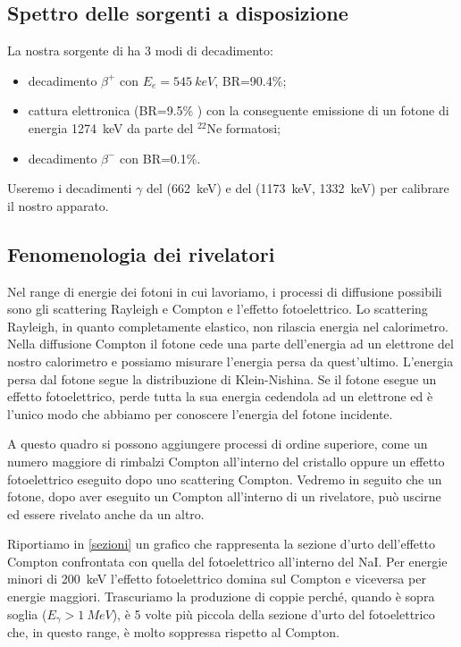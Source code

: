 \subsection{Spettro delle sorgenti a disposizione}

La nostra sorgente di \na{} ha 3 modi di decadimento:
\begin{itemize}
\item decadimento $\beta^+$ con $E_e=\SI{545}{keV}$, BR=90.4\%;
\item cattura elettronica (BR=9.5\% ) con la conseguente emissione di un fotone di energia \SI{1274}{keV} da parte del $^{22}$Ne formatosi;
\item decadimento $\beta^-$ con BR=0.1\%.
\end{itemize}

Useremo i decadimenti $\gamma$ del \cs{} (\SI{662}{keV}) e del \co{} (\SI{1173}{keV}, \SI{1332}{keV}) per calibrare il nostro apparato.


\subsection{Fenomenologia dei rivelatori}


Nel range di energie dei fotoni in cui lavoriamo, i processi di diffusione possibili sono gli scattering Rayleigh e Compton e l'effetto fotoelettrico.
Lo scattering Rayleigh, in quanto completamente elastico, non rilascia energia nel calorimetro.
Nella diffusione Compton il fotone cede una parte dell'energia ad un elettrone del nostro calorimetro e possiamo misurare l'energia persa da quest'ultimo. L'energia persa dal fotone segue la distribuzione di Klein-Nishina.
Se il fotone esegue un effetto fotoelettrico, perde tutta la sua energia cedendola ad un elettrone ed è l'unico modo che abbiamo per conoscere l'energia del fotone incidente.

A questo quadro si possono aggiungere processi di ordine superiore, come un numero maggiore di rimbalzi Compton all'interno del cristallo oppure un effetto fotoelettrico eseguito dopo uno scattering Compton.
Vedremo in seguito che un fotone, dopo aver eseguito un Compton all'interno di un rivelatore, può uscirne ed essere rivelato anche da un altro.

Riportiamo in \autoref{sezioni} un grafico che rappresenta la sezione d'urto dell'effetto Compton confrontata con quella del fotoelettrico all'interno del NaI. Per energie minori di \SI{200}{keV} l'effetto fotoelettrico domina sul Compton e viceversa per energie maggiori.
Trascuriamo la produzione di coppie perché, quando è sopra soglia ($E_{\gamma}>\SI{1}{MeV}$), è 5 volte più piccola della sezione d'urto del fotoelettrico che, in questo range, è molto soppressa rispetto al Compton.


